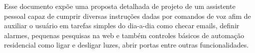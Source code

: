 Esse documento expõe uma proposta detalhada de projeto de um assistente pessoal capaz de cumprir diversas instruções dadas por comandos de voz afim de auxiliar o usuário em tarefas simples do dia-a-dia como checar emails, definir alarmes, pequenas pesquisas na web e também controles básicos de automação residencial como ligar e desligar luzes, abrir portas entre outras funcionalidades.
